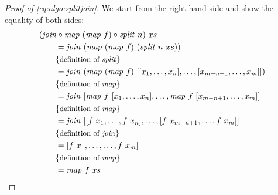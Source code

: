 \begin{proof}[Proof of \autoref{eq:algo:splitjoin}]
  We start from the right-hand side and show the equality of both sides:
  \begin{align*}
    &(\join \circ \map\ (\map\ f) \circ \splitN\ n)\ xs\\
    &\qquad = \join\ (\map\ (\map\ f)\ (\splitN\ n\ xs))\\
    &\qquad \comment{definition of \splitN}\\
    &\qquad = \join\ (\map\ (\map\ f)\ [[x_1, \ldots, x_n], \ldots, [x_{m-n+1}, \ldots, x_m]])\\
    &\qquad \comment{definition of \map}\\
    &\qquad = \join\ [\map\ f\ [x_1, \ldots, x_n], \ldots, \map\ f\ [x_{m-n+1}, \ldots, x_m]]\\
    &\qquad \comment{definition of \map}\\
    &\qquad = \join\ [[f\ x_1, \ldots, f\ x_n], \ldots, [f\ x_{m-n+1}, \ldots, f\ x_m]]\\
    &\qquad \comment{definition of \join}\\
    &\qquad = [f\ x_1, \ldots, \ldots, f\ x_m]\\
    &\qquad \comment{definition of \map}\\
    &\qquad = \map\ f\ xs
  \end{align*}
\end{proof}

